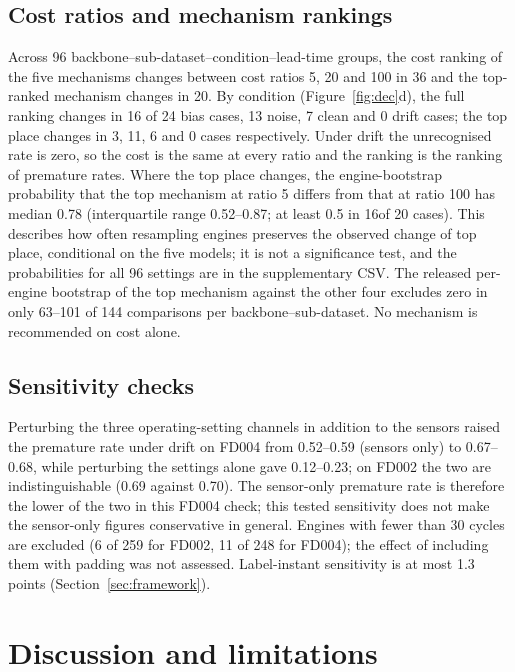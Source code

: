 \documentclass[11pt,a4paper]{article}
\newcommand{\NBootSig}{63--101}
\newcommand{\NAOneFDtwoSens}{0.69}
\newcommand{\NAOneFDtwoJoint}{0.70}
\newcommand{\NAOneFDfourSens}{0.52--0.59}
\newcommand{\NAOneFDfourJoint}{0.67--0.68}
\newcommand{\NAOneFDfourSet}{0.12--0.23}
\newcommand{\JExclTwo}{6}
\newcommand{\JExclFour}{11}
\newcommand{\JRevClean}{7}
\newcommand{\JTopClean}{6}
\newcommand{\JRevNoise}{13}
\newcommand{\JTopNoise}{11}
\newcommand{\JRevDrift}{0}
\newcommand{\JTopDrift}{0}
\newcommand{\JRevBias}{16}
\newcommand{\JTopBias}{3}
\newcommand{\JNBias}{24}
\newcommand{\JRevTotal}{36}
\newcommand{\JTopTotal}{20}
\newcommand{\JRevGroups}{96}
\newcommand{\JTopBootMed}{0.78}
\newcommand{\JTopBootIQR}{0.52--0.87}
\newcommand{\JTopBootN}{20}
\newcommand{\JTopBootGeFive}{16}
\newcommand{\JLabelHeadline}{1.3}
\begin{document}
\subsection{Cost ratios and mechanism rankings}\label{sec:cost}
Across \JRevGroups{} backbone--sub-dataset--condition--lead-time groups, the cost ranking of the five mechanisms changes between cost ratios 5, 20 and 100 in \JRevTotal{} and the top-ranked mechanism changes in \JTopTotal. By condition (Figure~\ref{fig:dec}d), the full ranking changes in \JRevBias{} of \JNBias{} bias cases, \JRevNoise{} noise, \JRevClean{} clean and \JRevDrift{} drift cases; the top place changes in \JTopBias, \JTopNoise, \JTopClean{} and \JTopDrift{} cases respectively. Under drift the unrecognised rate is zero, so the cost is the same at every ratio and the ranking is the ranking of premature rates. Where the top place changes, the engine-bootstrap probability that the top mechanism at ratio 5 differs from that at ratio 100 has median \JTopBootMed{} (interquartile range \JTopBootIQR; at least 0.5 in \JTopBootGeFive of \JTopBootN{} cases). This describes how often resampling engines preserves the observed change of top place, conditional on the five models; it is not a significance test, and the probabilities for all 96 settings are in the supplementary CSV. The released per-engine bootstrap of the top mechanism against the other four excludes zero in only \NBootSig{} of 144 comparisons per backbone--sub-dataset. No mechanism is recommended on cost alone.

\subsection{Sensitivity checks}\label{sec:sens}
Perturbing the three operating-setting channels in addition to the sensors raised the premature rate under drift on FD004 from \NAOneFDfourSens{} (sensors only) to \NAOneFDfourJoint, while perturbing the settings alone gave \NAOneFDfourSet{}; on FD002 the two are indistinguishable (\NAOneFDtwoSens{} against \NAOneFDtwoJoint). The sensor-only premature rate is therefore the lower of the two in this FD004 check; this tested sensitivity does not make the sensor-only figures conservative in general. Engines with fewer than 30 cycles are excluded (\JExclTwo{} of 259 for FD002, \JExclFour{} of 248 for FD004); the effect of including them with padding was not assessed. Label-instant sensitivity is at most \JLabelHeadline{} points (Section~\ref{sec:framework}).

\section{Discussion and limitations}
\end{document}
